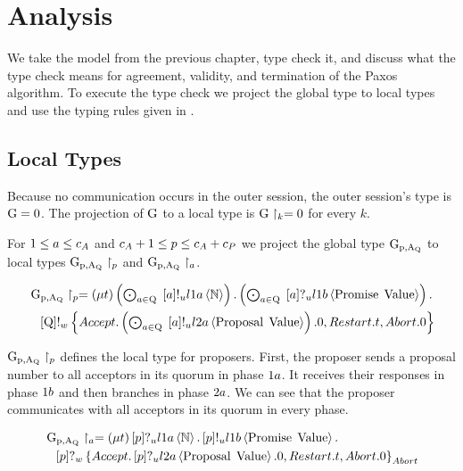 \chapter{Analysis}
We take the model from the previous chapter, type check it, and discuss what the type check means for agreement, validity, and termination of the Paxos algorithm.
To execute the type check we project the global type to local types and use the typing rules given in \cite{PetersEtal21}.

\section{Local Types}
Because no communication occurs in the outer session, the  outer session's type is $\operatorname{G} = 0$.
The projection of $\operatorname{G}$ to a local type is $\operatorname{G} \upharpoonright_{k} = 0$ for every $k$.

For $1 \leq a \leq c_A$ and $c_A + 1 \leq p \leq c_A + c_P$ we project the global type $\operatorname{G_{p, A_Q}}$ to local types $\operatorname{G_{p, A_Q}} \upharpoonright_{p}$ and $\operatorname{G_{p, A_Q}} \upharpoonright_{a}$.

\begin{align*}
&\operatorname{G_{p, A_Q}} \upharpoonright_{p} = \left(\mu t\right)
\textstyle\left(\bigodot_{a\in\operatorname{Q}}\;\left[a\right]!_u l1a \left\langle \mathbb{N} \right\rangle\right) .
\textstyle\left(\bigodot_{a\in\operatorname{Q}}\;\left[a\right]?_u l1b \left\langle \operatorname{Promise}\; \operatorname{Value} \right\rangle\right) .\\
&\hspace*{0.75em * 1}\left[\operatorname{Q}\right]!_w \left\{\mathnormal{Accept} . \textstyle\left(\bigodot_{a\in\operatorname{Q}}\;\left[a\right]!_u l2a \left\langle \operatorname{Proposal}\; \operatorname{Value} \right\rangle\right).0 , \mathnormal{Restart} . t , \mathnormal{Abort} .0\right\}
\end{align*}

$\operatorname{G_{p, A_Q}} \upharpoonright_{p}$ defines the local type for proposers.
First, the proposer sends a proposal number to all acceptors in its quorum in phase $1a$.
It receives their responses in phase $1b$ and then branches in phase $2a$.
We can see that the proposer communicates with all acceptors in its quorum in every phase.

\begin{align*}
&\operatorname{G_{p, A_Q}} \upharpoonright_{a} = \left(\mu t\right)
\left[p\right]?_u l1a \left\langle \mathbb{N} \right\rangle .
\left[p\right]!_u l1b \left\langle \operatorname{Promise}\; \operatorname{Value} \right\rangle .\\
&\hspace*{0.75em * 1}\left[p\right]?_w \left\{\mathnormal{Accept} . \left[p\right]?_u l2a \left\langle \operatorname{Proposal}\; \operatorname{Value} \right\rangle.0 , \mathnormal{Restart} . t , \mathnormal{Abort} .0\right\}_{\mathnormal{Abort}}
\end{align*}

